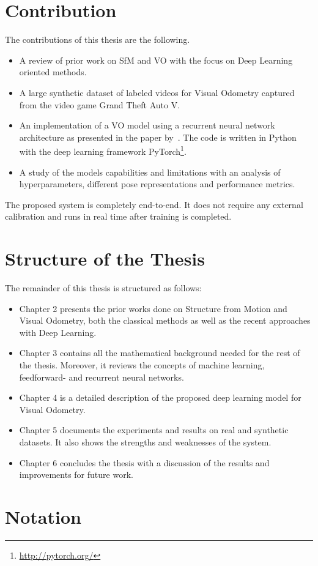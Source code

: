 	
	\section{Contribution}
		The contributions of this thesis are the following.
		\begin{itemize}
			\item A review of prior work on SfM and VO with the focus on Deep Learning oriented methods.
			
			\item A large synthetic dataset of labeled videos for Visual Odometry captured from the video game Grand Theft Auto V.
			
			\item An implementation of a VO model using a recurrent neural network architecture as presented in the paper by~\cite{wang2017deepvo}.
			The code is written in Python with the deep learning framework PyTorch\footnote{\url{http://pytorch.org/}}.
			
			\item A study of the models capabilities and limitations with an analysis of hyperparameters, different pose representations and performance metrics.
		\end{itemize}
		The proposed system is completely end-to-end.
		It does not require any external calibration and runs in real time after training is completed.
	
	\section{Structure of the Thesis}
		The remainder of this thesis is structured as follows:
		\begin{itemize}
			\item Chapter 2 presents the prior works done on Structure from Motion and Visual Odometry, both the classical methods as well as the recent approaches with Deep Learning.
			
			\item Chapter 3 contains all the mathematical background needed for the rest of the thesis.
			Moreover, it reviews the concepts of machine learning, feedforward- and recurrent neural networks.
			
			\item Chapter 4 is a detailed description of the proposed deep learning model for Visual Odometry.
			
			\item Chapter 5 documents the experiments and results on real and synthetic datasets.
			It also shows the strengths and weaknesses of the system.
			
			\item Chapter 6 concludes the thesis with a discussion of the results and improvements for future work.
		\end{itemize}
		
	\section{Notation}